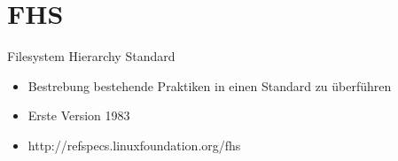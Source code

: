 \section{FHS}
\begin{frame}{Filesystem Hierarchy Standard}
\begin{itemize}
\item Bestrebung bestehende Praktiken in einen Standard zu überführen
\item Erste Version 1983
\item http://refspecs.linuxfoundation.org/fhs
\end{itemize}
\end{frame}